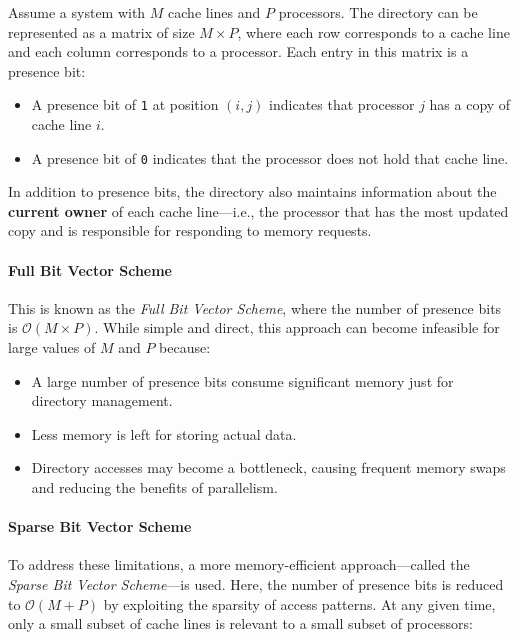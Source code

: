 \documentclass[12pt]{book}
\begin{document}
Assume a system with $M$ cache lines and $P$ processors. The directory can be represented as a matrix of size $M \times P$, where each row corresponds to a cache line and each column corresponds to a processor. Each entry in this matrix is a presence bit:

\begin{itemize}
    \item A presence bit of \texttt{1} at position $(i, j)$ indicates that processor $j$ has a copy of cache line $i$.
    \item A presence bit of \texttt{0} indicates that the processor does not hold that cache line.
\end{itemize}

In addition to presence bits, the directory also maintains information about the \textbf{current owner} of each cache line—i.e., the processor that has the most updated copy and is responsible for responding to memory requests.

\paragraph{Full Bit Vector Scheme}

This is known as the \textit{Full Bit Vector Scheme}, where the number of presence bits is $\mathcal{O}(M \times P)$. While simple and direct, this approach can become infeasible for large values of $M$ and $P$ because:

\begin{itemize}
    \item A large number of presence bits consume significant memory just for directory management.
    \item Less memory is left for storing actual data.
    \item Directory accesses may become a bottleneck, causing frequent memory swaps and reducing the benefits of parallelism.
\end{itemize}

\paragraph{Sparse Bit Vector Scheme}

To address these limitations, a more memory-efficient approach—called the \textit{Sparse Bit Vector Scheme}—is used. Here, the number of presence bits is reduced to $\mathcal{O}(M + P)$ by exploiting the sparsity of access patterns. At any given time, only a small subset of cache lines is relevant to a small subset of processors:
\end{document}
